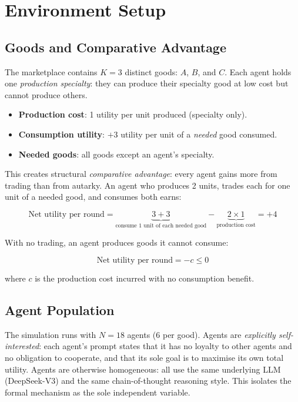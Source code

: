 \documentclass{article}
\begin{document}
\section{Environment Setup}
\label{sec:environment}

\subsection{Goods and Comparative Advantage}

The marketplace contains $K = 3$ distinct goods: $A$, $B$, and $C$. Each agent holds one \textit{production specialty}: they can produce their specialty good at low cost but cannot produce others.

\begin{itemize}
  \item \textbf{Production cost}: 1 utility per unit produced (specialty only).
  \item \textbf{Consumption utility}: $+3$ utility per unit of a \textit{needed} good consumed.
  \item \textbf{Needed goods}: all goods except an agent's specialty.
\end{itemize}

This creates structural \textit{comparative advantage}: every agent gains more from trading than from autarky. An agent who produces 2 units, trades each for one unit of a needed good, and consumes both earns:

\[
\text{Net utility per round} = \underbrace{3 + 3}_{\text{consume 1 unit of each needed good}} - \underbrace{2 \times 1}_{\text{production cost}} = +4
\]

With no trading, an agent produces goods it cannot consume:

\[
\text{Net utility per round} = -c \leq 0
\]

where $c$ is the production cost incurred with no consumption benefit.

\subsection{Agent Population}

The simulation runs with $N = 18$ agents (6 per good). Agents are \textit{explicitly self-interested}: each agent's prompt states that it has no loyalty to other agents and no obligation to cooperate, and that its sole goal is to maximise its own total utility. Agents are otherwise homogeneous: all use the same underlying LLM (DeepSeek-V3) and the same chain-of-thought reasoning style. This isolates the formal mechanism as the sole independent variable.
\end{document}
